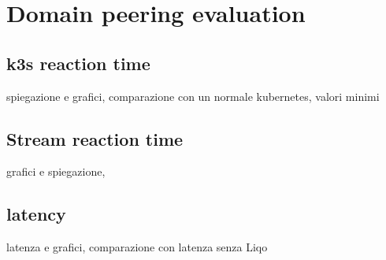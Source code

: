 \chapter{Domain peering evaluation}

\section{k3s reaction time}
spiegazione e grafici, comparazione con un normale kubernetes, valori minimi

\section{Stream reaction time}
grafici e spiegazione, 

\section{latency}
latenza e grafici, comparazione con latenza senza Liqo